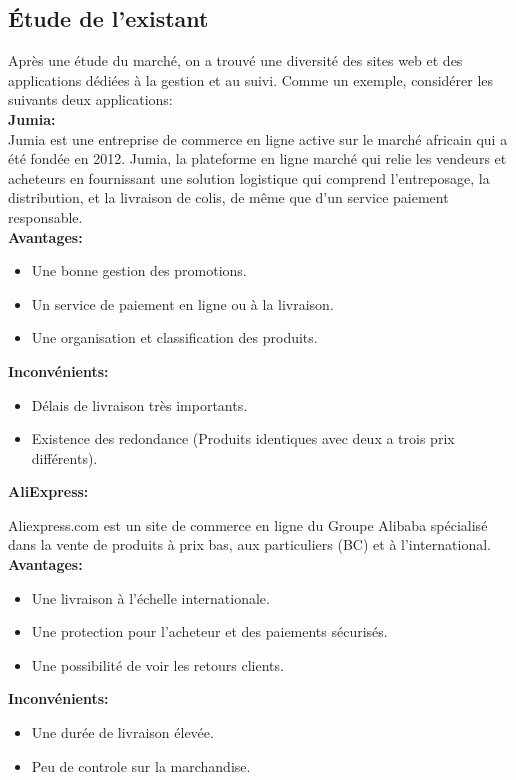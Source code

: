 \documentclass[a4paper]{report}
\begin{document}
\begin{doublespace}
\begin{doublespace}
        \subsection{Étude de l’existant}
        Après une étude du marché, on a trouvé une diversité des sites web et des applications dédiées à la
        gestion et au suivi.
        Comme un exemple, considérer les suivants deux applications:\\
        \textbf{\large Jumia:}\\
        Jumia est une entreprise de commerce en ligne active sur le marché africain qui a été fondée en 2012. Jumia, la plateforme en ligne marché qui relie les vendeurs et acheteurs en fournissant une solution logistique qui comprend l'entreposage, la distribution, et la livraison de colis, de même que d'un  service paiement responsable.\\
        \textbf{Avantages:}
        \begin{itemize}
            \item Une bonne gestion des promotions.
            \item Un service de paiement en ligne ou à la livraison.
            \item Une organisation et classification des produits.
        \end{itemize}
        \textbf{Inconvénients:}
        \begin{itemize}
            \item Délais de livraison très importants.
            \item Existence des redondance (Produits identiques avec deux a trois prix différents).
        \end{itemize}
        \textbf{\large AliExpress:}\\
        \begin{doublespace}
            Aliexpress.com est un site de commerce en ligne du Groupe Alibaba spécialisé dans la vente
            de produits à prix bas, aux particuliers (BC) et à l’international.\\
            \textbf{Avantages:}
            \begin{itemize}
                \item Une livraison à l’échelle internationale.
                \item Une protection pour l’acheteur et des paiements sécurisés.
                \item Une possibilité de voir les retours clients.
            \end{itemize}
            \textbf{Inconvénients:}
            \begin{itemize}
                \item Une durée de livraison élevée.
                \item Peu de controle sur la marchandise.
            \end{itemize}
            \newpage

\end{doublespace}
\end{doublespace}
\end{doublespace}
\end{document}
